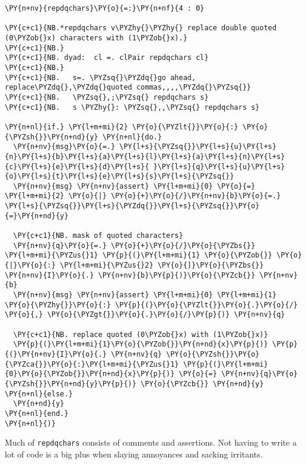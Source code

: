     \begin{tcolorbox}[breakable, size=fbox, boxrule=1pt, pad at break*=1mm,colback=cellbackground, colframe=cellborder]
\begin{Verbatim}[commandchars=\\\{\}]
\PY{n+nv}{repdqchars}\PY{o}{=:}\PY{n+nf}{4 : 0}

\PY{c+c1}{NB.*repdqchars v\PYZhy{}\PYZhy{} replace double quoted (0\PYZob{}x) characters with (1\PYZob{}x).}
\PY{c+c1}{NB.}
\PY{c+c1}{NB. dyad:  cl =. clPair repdqchars cl}
\PY{c+c1}{NB.}
\PY{c+c1}{NB.   s=. \PYZsq{}\PYZdq{}go ahead, replace\PYZdq{},\PYZdq{}quoted commas,,,,\PYZdq{}\PYZsq{}}
\PY{c+c1}{NB.   \PYZsq{},;\PYZsq{} repdqchars s}
\PY{c+c1}{NB.   s \PYZhy{}: \PYZsq{},,\PYZsq{} repdqchars s}

\PY{n+nl}{if.} \PY{l+m+mi}{2} \PY{o}{\PYZlt{}}\PY{o}{:} \PY{o}{\PYZsh{}}\PY{n+nd}{y} \PY{n+nl}{do.}
  \PY{n+nv}{msg}\PY{o}{=.} \PY{l+s}{\PYZsq{}}\PY{l+s}{u}\PY{l+s}{n}\PY{l+s}{b}\PY{l+s}{a}\PY{l+s}{l}\PY{l+s}{a}\PY{l+s}{n}\PY{l+s}{c}\PY{l+s}{e}\PY{l+s}{d}\PY{l+s}{ }\PY{l+s}{q}\PY{l+s}{u}\PY{l+s}{o}\PY{l+s}{t}\PY{l+s}{e}\PY{l+s}{s}\PY{l+s}{\PYZsq{}}
  \PY{n+nv}{msg} \PY{n+nv}{assert} \PY{l+m+mi}{0} \PY{o}{=} \PY{l+m+mi}{2} \PY{o}{|} \PY{o}{+}\PY{o}{/}\PY{n+nv}{b}\PY{o}{=.} \PY{l+s}{\PYZsq{}}\PY{l+s}{\PYZdq{}}\PY{l+s}{\PYZsq{}}\PY{o}{=}\PY{n+nd}{y}

  \PY{c+c1}{NB. mask of quoted characters}
  \PY{n+nv}{q}\PY{o}{=.} \PY{o}{+}\PY{o}{/}\PY{o}{\PYZbs{}} \PY{l+m+mi}{\PYZus{}1} \PY{p}{(}\PY{l+m+mi}{1} \PY{o}{\PYZob{}} \PY{o}{|}\PY{o}{:} \PY{l+m+mi}{\PYZus{}2} \PY{o}{]}\PY{o}{\PYZbs{}} \PY{n+nv}{I}\PY{o}{.} \PY{n+nv}{b}\PY{p}{)}\PY{o}{\PYZcb{}} \PY{n+nv}{b}
  \PY{n+nv}{msg} \PY{n+nv}{assert} \PY{l+m+mi}{0} \PY{l+m+mi}{1} \PY{o}{\PYZhy{}}\PY{o}{:} \PY{p}{(}\PY{o}{\PYZlt{}}\PY{o}{.}\PY{o}{/} \PY{o}{,} \PY{o}{\PYZgt{}}\PY{o}{.}\PY{o}{/}\PY{p}{)} \PY{n+nv}{q}

  \PY{c+c1}{NB. replace quoted (0\PYZob{}x) with (1\PYZob{}x)}
  \PY{p}{(}\PY{l+m+mi}{1}\PY{o}{\PYZob{}}\PY{n+nd}{x}\PY{p}{)} \PY{p}{(}\PY{n+nv}{I}\PY{o}{.} \PY{n+nv}{q} \PY{o}{\PYZsh{}}\PY{o}{\PYZca{}}\PY{o}{:}\PY{l+m+mi}{\PYZus{}1} \PY{p}{(}\PY{l+m+mi}{0}\PY{o}{\PYZob{}}\PY{n+nd}{x}\PY{p}{)} \PY{o}{=} \PY{n+nv}{q}\PY{o}{\PYZsh{}}\PY{n+nd}{y}\PY{p}{)} \PY{o}{\PYZcb{}} \PY{n+nd}{y}
\PY{n+nl}{else.} 
  \PY{n+nd}{y}
\PY{n+nl}{end.}
\PY{n+nl}{)}
\end{Verbatim}
\end{tcolorbox}

    Much of \texttt{repdqchars} consists of comments and assertions. Not
having to write a lot of code is a big plus when slaying annoyances and
sacking irritants.

